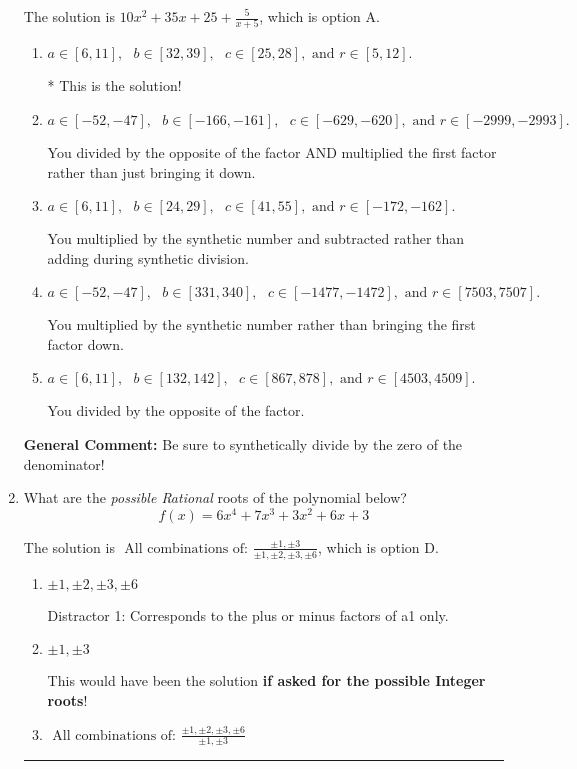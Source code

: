 \documentclass{extbook}[14pt]
\newcommand{\litem}[1]{\item #1

\rule{\textwidth}{0.4pt}}
\begin{document}
\begin{enumerate}
{The solution is \( 10x^{2} +35 x + 25 + \frac{5}{x + 5} \), which is option A.\begin{enumerate}[label=\Alph*.]
\item \( a \in [6, 11], \text{   } b \in [32, 39], \text{   } c \in [25, 28], \text{   and   } r \in [5, 12]. \)

* This is the solution!
\item \( a \in [-52, -47], \text{   } b \in [-166, -161], \text{   } c \in [-629, -620], \text{   and   } r \in [-2999, -2993]. \)

 You divided by the opposite of the factor AND multiplied the first factor rather than just bringing it down.
\item \( a \in [6, 11], \text{   } b \in [24, 29], \text{   } c \in [41, 55], \text{   and   } r \in [-172, -162]. \)

 You multiplied by the synthetic number and subtracted rather than adding during synthetic division.
\item \( a \in [-52, -47], \text{   } b \in [331, 340], \text{   } c \in [-1477, -1472], \text{   and   } r \in [7503, 7507]. \)

 You multiplied by the synthetic number rather than bringing the first factor down.
\item \( a \in [6, 11], \text{   } b \in [132, 142], \text{   } c \in [867, 878], \text{   and   } r \in [4503, 4509]. \)

 You divided by the opposite of the factor.
\end{enumerate}

\textbf{General Comment:} Be sure to synthetically divide by the zero of the denominator!
}
\litem{
What are the \textit{possible Rational} roots of the polynomial below?
\[ f(x) = 6x^{4} +7 x^{3} +3 x^{2} +6 x + 3 \]

The solution is \( \text{ All combinations of: }\frac{\pm 1,\pm 3}{\pm 1,\pm 2,\pm 3,\pm 6} \), which is option D.\begin{enumerate}[label=\Alph*.]
\item \( \pm 1,\pm 2,\pm 3,\pm 6 \)

 Distractor 1: Corresponds to the plus or minus factors of a1 only.
\item \( \pm 1,\pm 3 \)

This would have been the solution \textbf{if asked for the possible Integer roots}!
\item \( \text{ All combinations of: }\frac{\pm 1,\pm 2,\pm 3,\pm 6}{\pm 1,\pm 3} \)


\end{enumerate}}
\end{enumerate}
\end{document}
